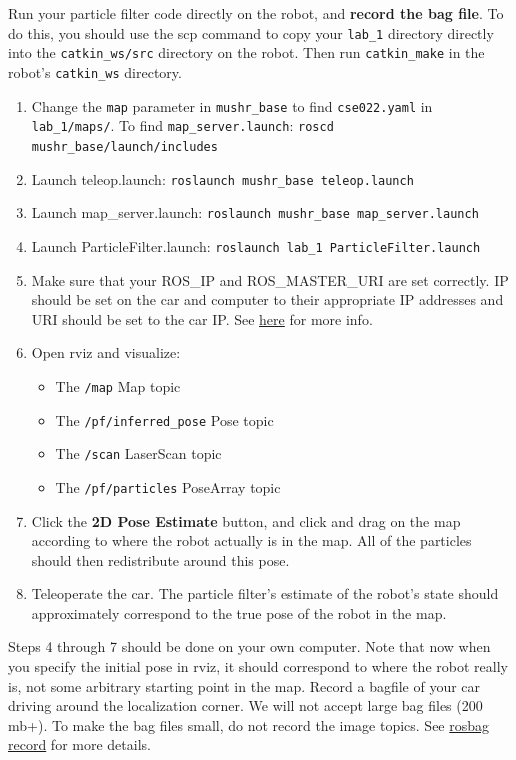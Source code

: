 \documentclass[final]{article}
\newcommand{\code}[1]{\texttt{#1}}
\newcommand{\cmdline}[1]{\colorbox{gray!30}{\texttt{#1}}}
\begin{document}
Run your particle filter code directly on the robot, and \textbf{record the bag file}. To do this, you should use the scp command to copy your \code{lab\_1} directory directly into the \code{catkin\_ws/src} directory on the robot. Then run \code{catkin\_make} in the robot's \code{catkin\_ws} directory.

\begin{enumerate}
\item Change the \code{map} parameter in \code{mushr\_base} to find \code{cse022.yaml} in  \code{lab\_1/maps/}. To find \code{map\_server.launch}: \cmdline{roscd mushr\_base/launch/includes}
\item Launch teleop.launch: \cmdline{roslaunch mushr\_base teleop.launch}
\item Launch map\_server.launch: \cmdline{roslaunch mushr\_base map\_server.launch}
\item Launch ParticleFilter.launch: \cmdline{roslaunch lab\_1 ParticleFilter.launch}
\item Make sure that your ROS\_IP and ROS\_MASTER\_URI are set correctly. IP should be set on the car and computer to their appropriate IP addresses and URI should be set to the car IP. See \href{http://wiki.ros.org/ROS/EnvironmentVariables#ROS_MASTER_URI}{here} for more info.
\item Open rviz and visualize:
	\begin{itemize}
	    \item The \code{/map} Map topic
		\item The \code{/pf/inferred\_pose} Pose topic
		\item The \code{/scan} LaserScan topic
		\item The \code{/pf/particles} PoseArray topic
	\end{itemize}
\item Click the \textbf{2D Pose Estimate} button, and click and drag on the map according to where the robot actually is in the map. All of the particles should then redistribute around this pose.
\item Teleoperate the car. The particle filter's estimate of the robot's state should approximately correspond to the true pose of the robot in the map.
\end{enumerate}

Steps 4 through 7 should be done on your own computer. Note that now when you specify the initial pose in rviz, it should correspond to where the robot really is, not some arbitrary starting point in the map. Record a bagfile of your car driving around the localization corner. We will not accept large bag files (200 mb+). To make the bag files small, do not record the image topics. See \href{http://wiki.ros.org/rosbag/Commandline#record}{rosbag record} for more details.
\end{document}

